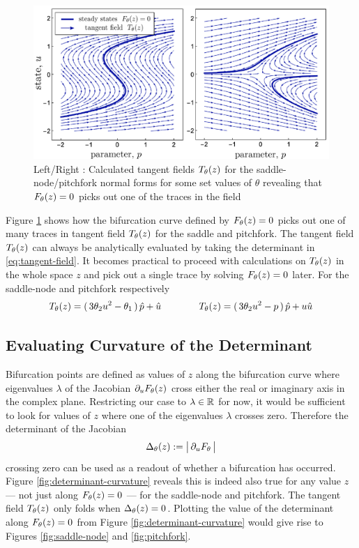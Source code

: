 \begin{figure}[H]
\centering{}
\captionsetup{justification=centering}
\includegraphics[width=14cm]{docs/figures/tangent-field}
\caption{Left/Right : Calculated tangent fields $T_{\theta}(z)$ for the saddle-node/pitchfork normal forms for some set values of $\theta$ revealing that $F_{\theta}(z)=0$ picks out one of the traces in the field}
\label{fig:tangent-field}
\end{figure}

Figure \ref{fig:tangent-field} shows how the bifurcation curve defined by $F_{\theta}(z)=0$ picks out one of many traces in tangent field $T_{\theta}(z)$ for the saddle and pitchfork. The tangent field $T_{\theta}(z)$ can always be analytically evaluated by taking the determinant in \eqref{eq:tangent-field}. It becomes practical to proceed with calculations on $T_{\theta}(z)$ in the whole space $z$ and pick out a single trace by solving $F_{\theta}(z)=0$ later. For the saddle-node and pitchfork respectively 
\begin{align}
    T_{\theta}(z)=(\,3\theta_2 u^2-\theta_1\,)\,\hat{p}+\hat{u}
    \qquad\qquad
    T_{\theta}(z)=(\,3\theta_2 u^2-p\,)\,\hat{p}+u\hat{u}
    \label{eq:tangent-field-examples}
\end{align}

\subsection{Evaluating Curvature of the Determinant}
Bifurcation points are defined as values of $z$ along the bifurcation curve where eigenvalues $\lambda$ of the Jacobian $\partial_u F_{\theta}(z)$ cross either the real or imaginary axis in the complex plane. Restricting our case to $\lambda\in\mathbb{R}$ for now, it would be sufficient to look for values of $z$ where one of the eigenvalues $\lambda$ crosses zero. Therefore the determinant of the Jacobian
\begin{align}
    \Delta_{\theta}(z) := \big|\,\partial_u F_{\theta}\,\big|
\end{align}
crossing zero can be used as a readout of whether a bifurcation has occurred. Figure \ref{fig:determinant-curvature} reveals this is indeed also true for any value $z$ --- not just along $F_{\theta}(z)=0$ --- for the saddle-node and pitchfork. The tangent field $T_{\theta}(z)$ only folds when $\Delta_{\theta}(z)=0$. Plotting the value of the determinant along $F_{\theta}(z)=0$ from Figure \ref{fig:determinant-curvature} would give rise to Figures \ref{fig:saddle-node} and \ref{fig:pitchfork}.

